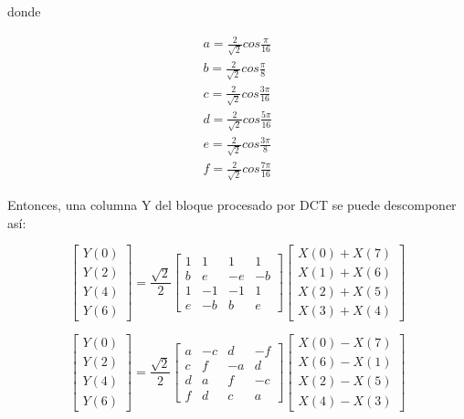 donde

\begin{eqnarray*}
    a = \frac{2}{\sqrt{2}}cos\frac{\pi}{16}\\
    b = \frac{2}{\sqrt{2}}cos\frac{\pi}{8}\\
    c = \frac{2}{\sqrt{2}}cos\frac{3\pi}{16}\\
    d = \frac{2}{\sqrt{2}}cos\frac{5\pi}{16}\\
    e = \frac{2}{\sqrt{2}}cos\frac{3\pi}{8}\\
    f = \frac{2}{\sqrt{2}}cos\frac{7\pi}{16}
\end{eqnarray*}

Entonces, una columna Y del bloque procesado por DCT se puede descomponer así:

\begin{equation}
    \label{eq:dct-row}
    \begin{bmatrix}
        Y(0) \\
        Y(2) \\
        Y(4) \\
        Y(6)
    \end{bmatrix}
    = \frac{\sqrt{2}}{2} \begin{bmatrix}
        1 & 1 & 1 & 1  \\
        b & e & -e & -b \\
        1 & -1 & -1 & 1  \\
        e & -b & b & e
        \end {bmatrix} \begin {bmatrix}
        X(0) + X(7) \\
        X(1) + X(6) \\
        X(2) + X(5) \\
        X(3) + X(4)
        \end {bmatrix}
\end{equation}

\begin{equation*}
    \begin{bmatrix}
        Y(0) \\
        Y(2) \\
        Y(4) \\
        Y(6)
    \end{bmatrix}
    = \frac{\sqrt{2}}{2} \begin{bmatrix}
        a & -c & d & -f  \\
        c & f & -a & d  \\
        d & a & f & -c  \\
        f & d & c & a
        \end {bmatrix} \begin {bmatrix}
        X(0) - X(7) \\
        X(6) - X(1) \\
        X(2) - X(5) \\
        X(4) - X(3)
        \end {bmatrix}
\end{equation*}

